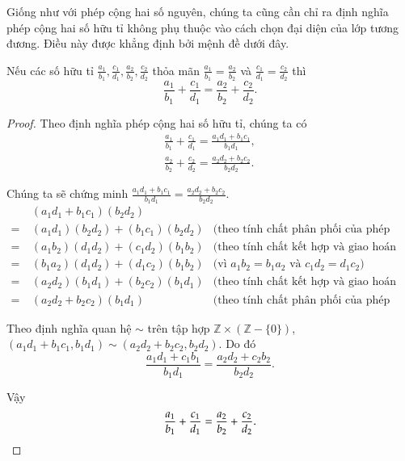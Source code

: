 Giống như với phép cộng hai số nguyên, chúng ta cũng cần chỉ ra định nghĩa phép cộng hai số hữu tỉ không phụ thuộc vào cách chọn đại diện của lớp tương đương. Điều này được khẳng định bởi mệnh đề dưới đây.
\begin{proposition}
    Nếu các số hữu tỉ $\frac{a_{1}}{b_{1}}, \frac{c_{1}}{d_{1}}, \frac{a_{2}}{b_{2}}, \frac{c_{2}}{d_{2}}$ thỏa mãn $\frac{a_{1}}{b_{1}} = \frac{a_{2}}{b_{2}}$ và $\frac{c_{1}}{d_{1}} = \frac{c_{2}}{d_{2}}$ thì
    \[
        \frac{a_{1}}{b_{1}} + \frac{c_{1}}{d_{1}} = \frac{a_{2}}{b_{2}} + \frac{c_{2}}{d_{2}}.
    \]
\end{proposition}

\begin{proof}
    Theo định nghĩa phép cộng hai số hữu tỉ, chúng ta có
    \[
        \begin{split}
            \frac{a_{1}}{b_{1}} + \frac{c_{1}}{d_{1}} = \frac{a_{1} d_{1} + b_{1} c_{1}}{b_{1} d_{1}}, \\
            \frac{a_{2}}{b_{2}} + \frac{c_{2}}{d_{2}} = \frac{a_{2} d_{2} + b_{2} c_{2}}{b_{2} d_{2}}.
        \end{split}
    \]

    Chúng ta sẽ chứng minh $\frac{a_{1} d_{1} + b_{1} c_{1}}{b_{1} d_{1}} = \frac{a_{2} d_{2} + b_{2} c_{2}}{b_{2} d_{2}}$.
    \begin{align*}
            & (a_{1} d_{1} + b_{1} c_{1}) (b_{2} d_{2})                                                                                           \\
        =\  & (a_{1} d_{1}) (b_{2} d_{2}) + (b_{1} c_{1}) (b_{2} d_{2}) & \text{(theo tính chất phân phối của phép nhân với phép cộng số nguyên)} \\
        =\  & (a_{1} b_{2}) (d_{1} d_{2}) + (c_{1} d_{2}) (b_{1} b_{2}) & \text{(theo tính chất kết hợp và giao hoán của phép nhân số nguyên)}    \\
        =\  & (b_{1} a_{2}) (d_{1} d_{2}) + (d_{1} c_{2}) (b_{1} b_{2}) & \text{(vì $a_{1} b_{2} = b_{1} a_{2}$ và $c_{1} d_{2} = d_{1} c_{2}$)}  \\
        =\  & (a_{2} d_{2}) (b_{1} d_{1}) + (b_{2} c_{2}) (b_{1} d_{1}) & \text{(theo tính chất kết hợp và giao hoán của phép nhân số nguyên)}    \\
        =\  & (a_{2} d_{2} + b_{2} c_{2}) (b_{1} d_{1})                 & \text{(theo tính chất phân phối của phép nhân với phép cộng số nguyên)}
    \end{align*}

    Theo định nghĩa quan hệ $\sim$ trên tập hợp $\mathbb{Z}\times(\mathbb{Z} - \{0\})$, $(a_{1} d_{1} + b_{1} c_{1}, b_{1} d_{1}) \sim (a_{2} d_{2} + b_{2} c_{2}, b_{2} d_{2})$. Do đó
    \[
        \frac{a_{1} d_{1} + c_{1} b_{1}}{b_{1} d_{1}} = \frac{a_{2} d_{2} + c_{2} b_{2}}{b_{2} d_{2}}.
    \]

    Vậy
    \[
        \frac{a_{1}}{b_{1}} + \frac{c_{1}}{d_{1}} = \frac{a_{2}}{b_{2}} + \frac{c_{2}}{d_{2}}.\qedhere
    \]
\end{proof}

